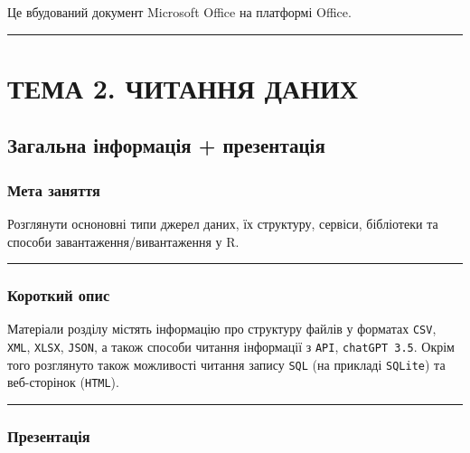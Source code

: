 \documentclass[
  letterpaper,
  DIV=11,
  numbers=noendperiod]{scrreprt}
\begin{document}
Це вбудований документ Microsoft Office на платформі Office.

\begin{center}\rule{0.5\linewidth}{0.5pt}\end{center}

\part{ТЕМА 2. ЧИТАННЯ ДАНИХ}

\chapter{Загальна інформація +
презентація}\label{ux437ux430ux433ux430ux43bux44cux43dux430-ux456ux43dux444ux43eux440ux43cux430ux446ux456ux44f-ux43fux440ux435ux437ux435ux43dux442ux430ux446ux456ux44f-1}

\section{Мета
заняття}\label{ux43cux435ux442ux430-ux437ux430ux43dux44fux442ux442ux44f-1}

Розглянути осноновні типи джерел даних, їх структуру, сервіси,
бібліотеки та способи завантаження/вивантаження у R.

\begin{center}\rule{0.5\linewidth}{0.5pt}\end{center}

\section{Короткий
опис}\label{ux43aux43eux440ux43eux442ux43aux438ux439-ux43eux43fux438ux441-1}

Матеріали розділу містять інформацію про структуру файлів у форматах
\texttt{CSV}, \texttt{XML}, \texttt{XLSX}, \texttt{JSON}, а також
способи читання інформації з \texttt{API}, \texttt{chatGPT\ 3.5}. Окрім
того розглянуто також можливості читання запису \texttt{SQL} (на
прикладі \texttt{SQLite}) та веб-сторінок (\texttt{HTML}).

\begin{center}\rule{0.5\linewidth}{0.5pt}\end{center}

\section{Презентація}\label{ux43fux440ux435ux437ux435ux43dux442ux430ux446ux456ux44f}
\end{document}
